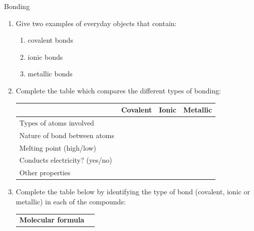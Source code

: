             \begin{exercises}{Bonding}
            \nopagebreak \noindent
\begin{enumerate}[noitemsep, label=\textbf{\arabic*}. ] 
\item Give two examples of everyday objects that contain:
\begin{enumerate}[noitemsep, label=\textbf{\alph*}. ] 
\item covalent bonds
\item ionic bonds
\item metallic bonds
\end{enumerate}
               \label{m38694*uid90}\item Complete the table which compares the different types of bonding:
          \begin{table}[H]
        \begin{center}
      \label{m38694*id143180}
    \noindent
      \begin{tabular}{|l|l|l|l|}\hline
         &
        \textbf{Covalent} &
        \textbf{Ionic} &
        \textbf{Metallic} \\ \hline
        Types of atoms involved &
         &
         &
        \\ \hline
        Nature of bond between atoms &
         &
         &
       \\ \hline
        Melting point (high/low) &
         &
         &
       \\ \hline
        Conducts electricity? (yes/no) &
         &
         &
      \\ \hline
        Other properties &
         &
         &
       \\ \hline
    \end{tabular}
      \end{center}
\end{table}
    \par
\item Complete the table below by identifying the type of bond (covalent, ionic or metallic) in each of the compounds:
          \begin{table}[H]
        \begin{center}
    \noindent
      \begin{tabular}{|l|l|}\hline
        \textbf{Molecular formula} &

\end{tabular}
\end{center}
\end{table}
\end{enumerate}
\end{exercises}
